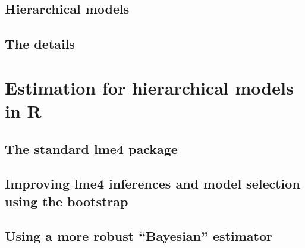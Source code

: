 \documentclass[a4paper,12pt]{article}
\begin{document}
\subsection{Hierarchical models}
\label{sec:hierarchicalmodels}


\subsection{The details}
\label{sec:thedetails}


\section{Estimation for hierarchical models in R}
\label{sec:usefulfunctionsandpackages}

\subsection{The standard lme4 package}
\label{sec:thestandardlm4package}

\subsection{Improving lme4 inferences and model selection using the bootstrap}
\label{sec:improvinglme4inferencesandmodelselectionusingthe bootstrap}

\subsection{Using a more robust ``Bayesian'' estimator}
\label{sec:usingamorerobustbayesianestimator}


%
%


\printbibliography
\end{document}
